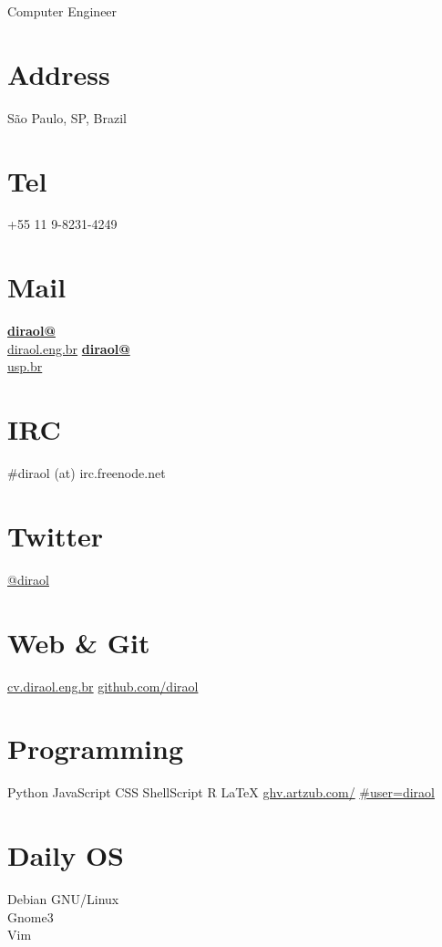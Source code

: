 \documentclass[]{friggeri-cv}
\begin{document}
\thispagestyle{empty}
      {Computer Engineer}
      

\begin{aside}
  \section{Address}
    São Paulo, SP, Brazil
    ~
  \section{Tel}
    +55 11 9-8231-4249
    ~
  \section{Mail}
    \href{mailto:diraol@diraol.eng.br}{\textbf{diraol@}\\diraol.eng.br}
    \href{mailto:diraol@usp.br}{\textbf{diraol@}\\usp.br}
    ~
  \section{IRC}
    \#diraol (at) irc.freenode.net
    ~
  \section{Twitter}
    \href{http://twitter.com/diraol}{@diraol}
    ~
  \section{Web \& Git}
    \href{http://cv.diraol.eng.br}{cv.diraol.eng.br}
    \href{https://github.com/diraol}{github.com/diraol}
    ~
  \section{Programming}
    Python
    JavaScript
    CSS
    ShellScript
    R
    \LaTeX
    \href{http://ghv.artzub.com/\#user=diraol}{ghv.artzub.com/}
    \href{http://ghv.artzub.com/\#user=diraol}{\#user=diraol}
    ~
  \section{Daily OS}
    Debian GNU/Linux\\%
    Gnome3\\%
    Vim
    ~

\end{aside}
\end{document}
